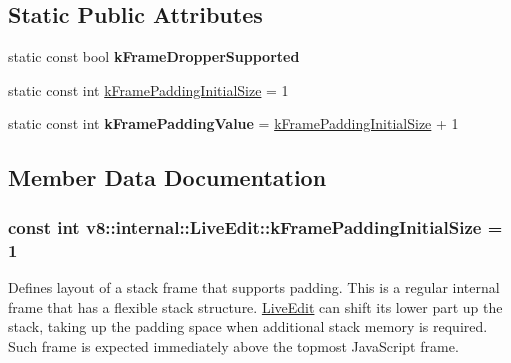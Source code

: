 \subsection*{Static Public Attributes}
\begin{DoxyCompactItemize}
\item 
static const bool {\bfseries k\+Frame\+Dropper\+Supported}\hypertarget{classv8_1_1internal_1_1_live_edit_a065987e52e8dd61f79875776a2ffe141}{}\label{classv8_1_1internal_1_1_live_edit_a065987e52e8dd61f79875776a2ffe141}

\item 
static const int \hyperlink{classv8_1_1internal_1_1_live_edit_ac4c2e93e880c61cc4b7167211f3509db}{k\+Frame\+Padding\+Initial\+Size} = 1
\item 
static const int {\bfseries k\+Frame\+Padding\+Value} = \hyperlink{classv8_1_1internal_1_1_live_edit_ac4c2e93e880c61cc4b7167211f3509db}{k\+Frame\+Padding\+Initial\+Size} + 1\hypertarget{classv8_1_1internal_1_1_live_edit_a0551d143d88b1c65cd64b294aafadc71}{}\label{classv8_1_1internal_1_1_live_edit_a0551d143d88b1c65cd64b294aafadc71}

\end{DoxyCompactItemize}


\subsection{Member Data Documentation}
\subsubsection[{\texorpdfstring{k\+Frame\+Padding\+Initial\+Size}{kFramePaddingInitialSize}}]{\setlength{\rightskip}{0pt plus 5cm}const int v8\+::internal\+::\+Live\+Edit\+::k\+Frame\+Padding\+Initial\+Size = 1\hspace{0.3cm}{\ttfamily [static]}}\hypertarget{classv8_1_1internal_1_1_live_edit_ac4c2e93e880c61cc4b7167211f3509db}{}\label{classv8_1_1internal_1_1_live_edit_ac4c2e93e880c61cc4b7167211f3509db}
Defines layout of a stack frame that supports padding. This is a regular internal frame that has a flexible stack structure. \hyperlink{classv8_1_1internal_1_1_live_edit}{Live\+Edit} can shift its lower part up the stack, taking up the \textquotesingle{}padding\textquotesingle{} space when additional stack memory is required. Such frame is expected immediately above the topmost Java\+Script frame.

